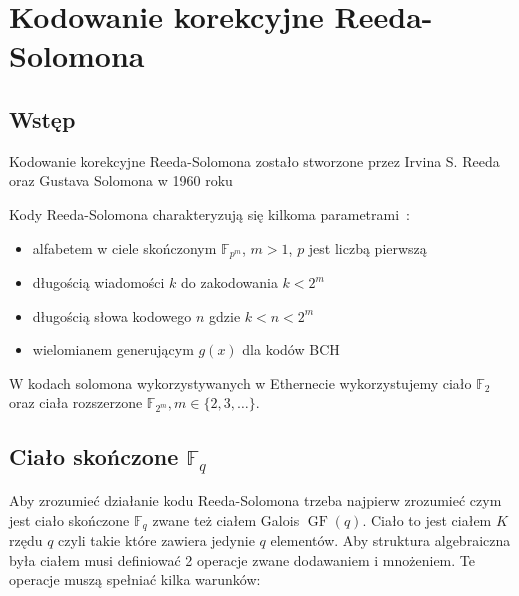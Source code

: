 \section{Kodowanie korekcyjne Reeda-Solomona}
\subsection{Wstęp}

Kodowanie korekcyjne Reeda-Solomona zostało stworzone przez Irvina S. Reeda
oraz Gustava Solomona w 1960 roku~\cite{Reed-Solomon-original}

Kody Reeda-Solomona charakteryzują się kilkoma parametrami~\cite{Reed-Solomon-Encoding-Decoding}:
\begin{itemize}
    \item alfabetem w ciele skończonym $\mathbb{F}_{p^m}$, $m>1$, $p$ jest liczbą
    pierwszą
    \item długością wiadomości $k$ do zakodowania $k < 2^{m}$
    \item długością słowa kodowego $n$ gdzie $k < n < 2^{m}$
    \item wielomianem generującym $g(x)$ dla kodów BCH
\end{itemize}

W kodach solomona wykorzystywanych w Ethernecie wykorzystujemy ciało $\mathbb{F}_2$ oraz ciała rozszerzone
$\mathbb{F}_{2^m}, m \in \{ 2, 3, \ldots \}$.

\subsection{Ciało skończone $\mathbb{F}_{q}$}

Aby zrozumieć działanie kodu Reeda-Solomona trzeba najpierw zrozumieć czym jest
ciało skończone $\mathbb{F}_q$ zwane też ciałem Galois $\operatorname{GF}(q)$.
Ciało to jest ciałem $K$ rzędu $q$ czyli takie które zawiera jedynie $q$ elementów.
Aby struktura algebraiczna była ciałem musi definiować 2 operacje zwane
dodawaniem i mnożeniem.
Te operacje muszą spełniać kilka warunków:

